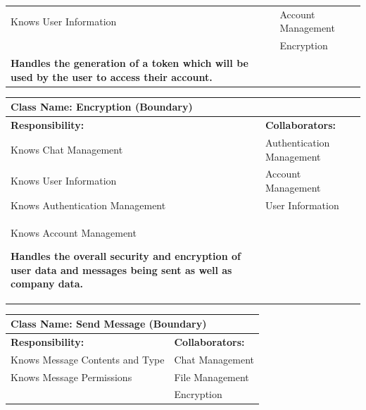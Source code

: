 \documentclass[]{article}
\begin{document}
\begin{itemize}
\begin{table}[ht]
\begin{tabular}{|p{7cm}|p{7cm}|}
            Knows User Information & Account Management\\
            & Encryption\\
            
            \vspace{0.1in}
            \textbf{Handles the generation of a token which will be used by the user to access their account.}

		\vspace{1in} & \\
		\hline
  
		\end{tabular}
	\end{table}

	\begin{table}[ht]
		\centering
		\begin{tabular}{|p{7cm}|p{7cm}|}
		\hline 
		 \multicolumn{2}{|l|}{\textbf{Class Name: Encryption (Boundary)
}} \\
		\hline
		\textbf{Responsibility:} & \textbf{Collaborators:} \\
		\hline
            Knows Chat Management & Authentication Management\\
            Knows User Information & Account Management\\
            Knows Authentication Management & User Information\\
            Knows Account Management
            
            \vspace{0.1in}
            \textbf{Handles the overall security and encryption of user data and messages being sent as well as company data.}

		\vspace{1in} & \\
		\hline
  
		\end{tabular}
	\end{table}

	\begin{table}[ht]
		\centering
		\begin{tabular}{|p{7cm}|p{7cm}|}
		\hline 
		 \multicolumn{2}{|l|}{\textbf{Class Name: Send Message (Boundary)
}} \\
		\hline
		\textbf{Responsibility:} & \textbf{Collaborators:} \\
		\hline
            Knows Message Contents and Type & Chat Management\\
            Knows Message Permissions & File Management\\
            & Encryption\\
            

\end{tabular}
\end{table}
\end{itemize}
\end{document}
